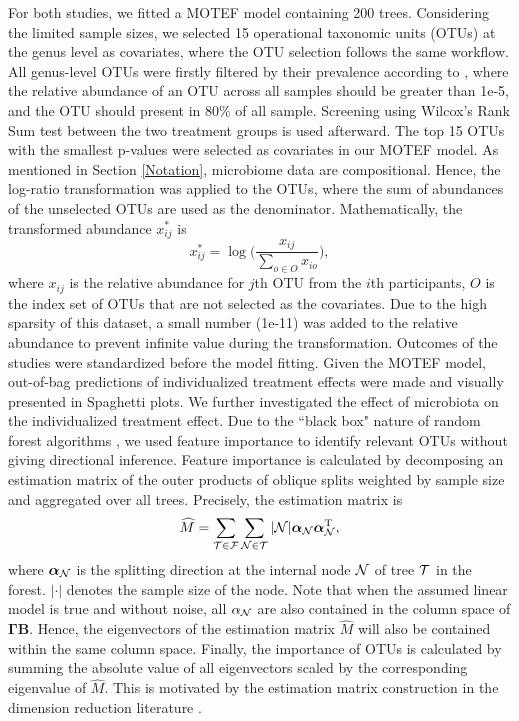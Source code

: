 \documentclass[smallextended]{svjour3}
\newcommand{\trnp}{^\text{T}}
\begin{document}
For both studies, we fitted a MOTEF model containing 200 trees. Considering the limited sample sizes, we selected 15 operational taxonomic units (OTUs) at the genus level as covariates, where the OTU selection follows the same workflow. All genus-level OTUs were firstly filtered by their prevalence according to \citep{callahan2016bioconductor}, where the relative abundance of an OTU across all samples should be greater than 1e-5, and the OTU should present in 80\% of all sample. Screening using Wilcox's Rank Sum test between the two treatment groups is used afterward. The top 15 OTUs with the smallest p-values were selected as covariates in our MOTEF model. As mentioned in Section \ref{Notation}, microbiome data are compositional. Hence, the log-ratio transformation was applied to the OTUs, where the sum of abundances of the unselected OTUs are used as the denominator. Mathematically, the transformed abundance $x_{ij}^*$ is
\begin{equation*}
    x_{ij}^* = \log\Big(\frac{x_{ij}}{\sum\limits_{o \in O} x_{io}}\Big),    
\end{equation*}
where $x_{ij}$ is the relative abundance for $j$th OTU from the $i$th participants,
$O$ is the index set of OTUs that are not selected as the covariates. Due to the high sparsity of this dataset, a small number (1e-11) was added to the relative abundance to prevent infinite value during the transformation. Outcomes of the studies were standardized before the model fitting. Given the MOTEF model, out-of-bag predictions of individualized treatment effects were made and visually presented in Spaghetti plots. We further investigated the effect of microbiota on the individualized treatment effect. Due to the ``black box" nature of random forest algorithms \citep{breiman2001statistical}, we used feature importance to identify relevant OTUs without giving directional inference. Feature importance is calculated by decomposing an estimation matrix of the outer products of oblique splits weighted by sample size and aggregated over all trees. Precisely, the estimation matrix is
\begin{equation*}
    \widehat{M} = \sum\limits_{{\cal T} \in {\cal F}} \sum\limits_{{\cal N} \in {\cal T}}|{\cal N}|\bm \alpha_{\cal N} \bm\alpha_{\cal N}\trnp,
\end{equation*}
where $\bm \alpha_{\cal N}$ is the splitting direction at the internal node ${\cal N}$ of tree ${\cal T}$ in the forest. $|\cdot|$ denotes the sample size of the node. Note that when the assumed linear model is true and without noise, all $\alpha_{\cal N}$ are also contained in the column space of $\bm \Gamma \bm B$. Hence, the eigenvectors of the estimation matrix $\widehat{M}$ will also be contained within the same column space. Finally, the importance of OTUs is calculated by summing the absolute value of all eigenvectors scaled by the corresponding eigenvalue of $\widehat{M}$. This is motivated by the estimation matrix construction in the dimension reduction literature \cite{li1991sliced}.
\end{document}

